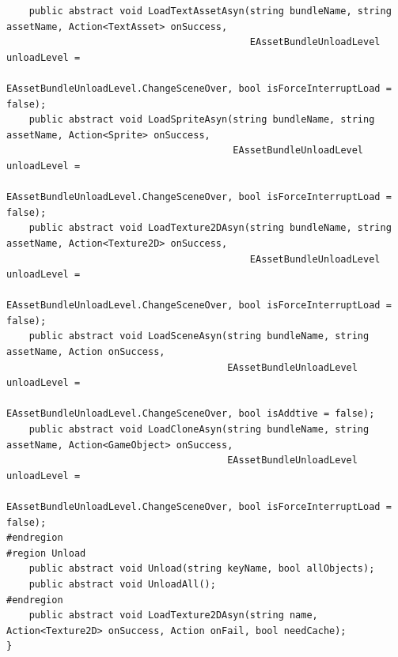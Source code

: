 \documentclass[9pt, b5paper]{article}
\begin{document}
\begin{itemize}
\begin{verbatim}
    public abstract void LoadTextAssetAsyn(string bundleName, string assetName, Action<TextAsset> onSuccess, 
                                           EAssetBundleUnloadLevel unloadLevel = 
                                           EAssetBundleUnloadLevel.ChangeSceneOver, bool isForceInterruptLoad = false);
    public abstract void LoadSpriteAsyn(string bundleName, string assetName, Action<Sprite> onSuccess, 
                                        EAssetBundleUnloadLevel unloadLevel = 
                                        EAssetBundleUnloadLevel.ChangeSceneOver, bool isForceInterruptLoad = false);
    public abstract void LoadTexture2DAsyn(string bundleName, string assetName, Action<Texture2D> onSuccess, 
                                           EAssetBundleUnloadLevel unloadLevel = 
                                           EAssetBundleUnloadLevel.ChangeSceneOver, bool isForceInterruptLoad = false);
    public abstract void LoadSceneAsyn(string bundleName, string assetName, Action onSuccess, 
                                       EAssetBundleUnloadLevel unloadLevel = 
                                       EAssetBundleUnloadLevel.ChangeSceneOver, bool isAddtive = false);
    public abstract void LoadCloneAsyn(string bundleName, string assetName, Action<GameObject> onSuccess, 
                                       EAssetBundleUnloadLevel unloadLevel = 
                                       EAssetBundleUnloadLevel.ChangeSceneOver, bool isForceInterruptLoad = false);
#endregion
#region Unload
    public abstract void Unload(string keyName, bool allObjects);
    public abstract void UnloadAll();
#endregion
    public abstract void LoadTexture2DAsyn(string name, Action<Texture2D> onSuccess, Action onFail, bool needCache);
}
\end{verbatim}
\end{itemize}
\end{document}
